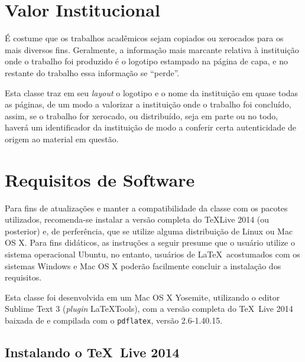 \section{Valor Institucional}

É costume que os trabalhos acadêmicos sejam copiados ou xerocados para os mais diversos fins. Geralmente, a informação mais marcante relativa à instituição onde o trabalho foi produzido é o logotipo estampado na página de capa, e no restante do trabalho essa informação se ``perde''.

Esta classe traz em seu \emph{layout} o logotipo e o nome da instituição em quase todas as páginas, de um modo a valorizar a instituição onde o trabalho foi concluído, assim, se o trabalho for xerocado, ou distribuído, seja em parte ou no todo, haverá um identificador da instituição de modo a conferir certa autenticidade de origem ao material em questão.

\section{Requisitos de Software}

Para fins de atualizações e manter a compatibilidade da classe com os pacotes utilizados, recomenda-se instalar a versão completa do \TeX Live 2014 (ou posterior) e, de perferência, que se utilize alguma distribuição de Linux ou Mac OS X. Para fins didáticos, as instruções a seguir presume que o usuário utilize o sistema operacional Ubuntu, no entanto, usuários de \LaTeX\ acostumados com os sistemas Windows e Mac OS X poderão facilmente concluir a instalação dos requisitos.

Esta classe foi desenvolvida em um Mac OS X Yosemite, utilizando o editor Sublime Text 3 (\emph{plugin} LaTeXTools), com a versão completa do \TeX\ Live 2014 baixada de  e compilada com o \Verb+pdflatex+, versão 2.6-1.40.15.

\subsection{Instalando o \TeX\ Live 2014}


